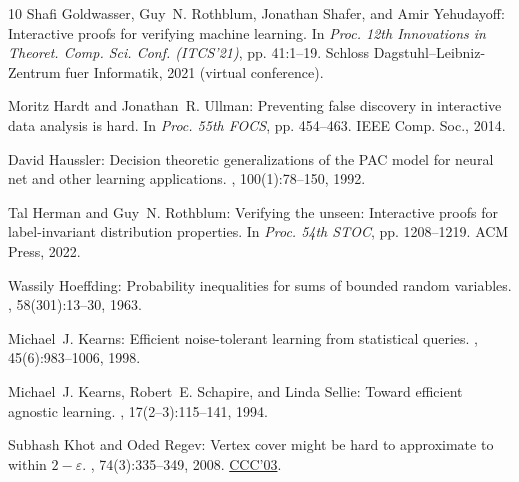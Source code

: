 \begin{thebibliography}{10}
{\sc Shafi Goldwasser, Guy~N. Rothblum, Jonathan Shafer, and Amir Yehudayoff}:
  Interactive proofs for verifying machine learning.
\newblock In {\em Proc. 12th Innovations in Theoret. Comp. Sci. Conf.
  (ITCS'21)}, pp. 41:1--19. Schloss Dagstuhl--Leibniz-Zentrum fuer Informatik,
  2021 (virtual conference).

{\sc Moritz Hardt and Jonathan~R. Ullman}: Preventing false discovery in
  interactive data analysis is hard.
\newblock In {\em Proc. 55th FOCS}, pp. 454--463. IEEE Comp. Soc., 2014.

{\sc David Haussler}: Decision theoretic generalizations of the {PAC} model for
  neural net and other learning applications.
, 100(1):78--150, 1992.
\newblock [\epfmtdoi{10.1016/0890-5401(92)90010-D}]

{\sc Tal Herman and Guy~N. Rothblum}: Verifying the unseen: {I}nteractive
  proofs for label-invariant distribution properties.
\newblock In {\em Proc. 54th STOC}, pp. 1208--1219. ACM Press, 2022.
\newblock [\epfmtdoi{10.1145/3519935.3519987}]

{\sc Wassily Hoeffding}: Probability inequalities for sums of bounded random
  variables.
, 58(301):13--30, 1963.
\newblock [\epfmtdoi{10.2307/2282952}]

{\sc Michael~J. Kearns}: Efficient noise-tolerant learning from statistical
  queries.
, 45(6):983--1006, 1998.
\newblock [\epfmtdoi{10.1145/293347.293351}]

{\sc Michael~J. Kearns, Robert~E. Schapire, and Linda Sellie}: Toward efficient
  agnostic learning.
, 17(2--3):115--141, 1994.
\newblock [\epfmtdoi{10.1007/BF00993468}]

{\sc Subhash Khot and Oded Regev}: Vertex cover might be hard to approximate to
  within $2-\varepsilon$.
, 74(3):335--349, 2008.
\newblock \prelim \href{https://doi.org/10.1109/CCC.2003.1214437}{CCC'03}.


\end{thebibliography}
